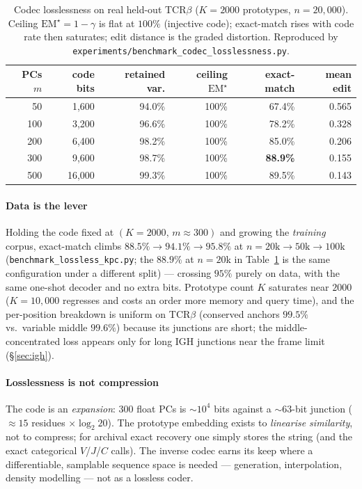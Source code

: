 \documentclass[11pt]{article}
\theoremstyle{oldplain}
\theoremstyle{oldrem}
\newcommand{\code}[1]{\texttt{#1}}
\begin{document}
\begin{table}[t]\centering\small
\caption{Codec losslessness on real held-out {\scshape TCR}$\beta$ ($K=2000$ prototypes,
$n=20{,}000$). Ceiling $\mathrm{EM}^\star=1-\gamma$ is flat at $100\%$ (injective code); exact-match
rises with code rate then saturates; edit distance is the graded distortion. Reproduced by
\code{experiments/benchmark\_codec\_losslessness.py}.}
\label{tab:rd}
\begin{tabular}{rrrrrr}
\toprule
PCs $m$ & code bits & retained var. & ceiling $\mathrm{EM}^\star$ & exact-match & mean edit \\
\midrule
 50 & 1{,}600  & 94.0\% & 100\% & 67.4\% & 0.565 \\
100 & 3{,}200  & 96.6\% & 100\% & 78.2\% & 0.328 \\
200 & 6{,}400  & 98.2\% & 100\% & 85.0\% & 0.206 \\
300 & 9{,}600  & 98.7\% & 100\% & \textbf{88.9\%} & 0.155 \\
500 & 16{,}000 & 99.3\% & 100\% & 89.5\% & 0.143 \\
\bottomrule
\end{tabular}
\end{table}

\paragraph{Data is the lever} Holding the code fixed at $(K=2000,\,m\!\approx\!300)$ and growing the
\emph{training} corpus, exact-match climbs $88.5\%\to94.1\%\to95.8\%$ at $n=20\text{k}\to50\text{k}
\to100\text{k}$ (\code{benchmark\_lossless\_kpc.py}; the $88.9\%$ at $n{=}20$k in Table~\ref{tab:rd} is the same
configuration under a different split) --- crossing $95\%$ purely on data, with the same
one-shot decoder and no extra bits. Prototype count $K$ saturates near $2000$ ($K=10{,}000$ regresses
and costs an order more memory and query time), and the per-position breakdown is uniform on
{\scshape TCR}$\beta$ (conserved anchors $99.5\%$ vs.\ variable middle $99.6\%$) because its junctions
are short; the middle-concentrated loss appears only for long {\scshape IGH} junctions near the frame
limit (\S\ref{sec:igh}).

\paragraph{Losslessness is not compression} The code is an \emph{expansion}: $300$ float PCs is
$\sim\!10^4$ bits against a $\sim\!63$-bit junction ($\approx15$ residues $\times\log_2 20$). The
prototype embedding exists to \emph{linearise similarity}, not to compress; for archival exact
recovery one simply stores the string (and the exact categorical $V$/$J$/$C$ calls). The inverse
codec earns its keep where a differentiable, samplable sequence space is needed --- generation,
interpolation, density modelling --- not as a lossless coder.
\end{document}
